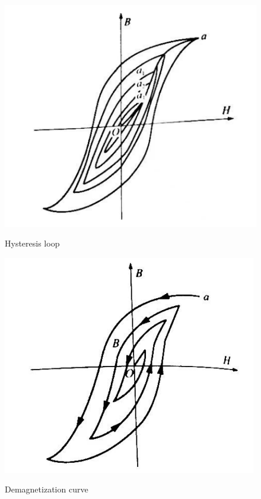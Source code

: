 \documentclass[UTF8]{article}
\begin{document}
      \begin{figure}[H]
             \begin{minipage}[t]{0.5\linewidth}
                \centering
                \includegraphics[clip,scale=0.9,trim={0 0 0 0}]{fig/fig5.png}
                \label{figure.11}
                \caption{Hysteresis loop}
             \end{minipage}
             \begin{minipage}[t]{0.5\linewidth}
                \centering
                \includegraphics[clip,scale=0.9,trim={0 0 0 0}]{fig/fig6.png}
                \label{figure.12}
                \caption{Demagnetization curve}
             \end{minipage}   	  
          \end{figure}  
          
\end{document}

